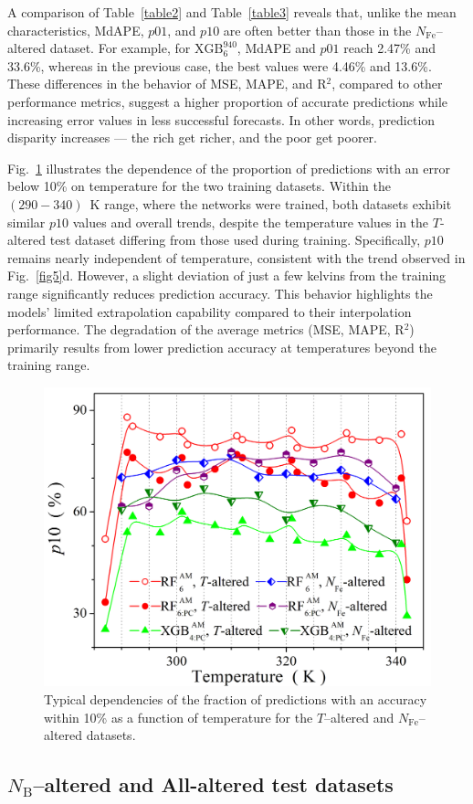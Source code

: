 \documentclass[a4paper,fleqn]{cas-sc}
\begin{document}
A comparison of Table~\ref{table2} and Table~\ref{table3} reveals that, 
unlike the mean characteristics, MdAPE, $p01$, and $p10$ are often better than those in the $N_\mathrm{Fe}$--altered dataset.
For example, for $\mathrm{XGB}^{940}_{6}$, MdAPE and $p01$ reach 2.47\% and 33.6\%, 
whereas in the previous case, the best values were 4.46\% and 13.6\%.
These differences in the behavior of MSE, MAPE, and R$^2$, compared to other performance metrics, 
suggest a higher proportion of accurate predictions while increasing error values in less successful forecasts.
In other words, prediction disparity increases --- 
the rich get richer, and the poor get poorer.

Fig.~\ref{fig10} illustrates the dependence of the proportion of predictions with an error below 10\% on temperature for the two training datasets.
Within the $(290-340)$~K range, where the networks were trained, both datasets exhibit similar $p10$ values and overall trends, 
despite the temperature values in the $T$-altered test dataset differing from those used during training.
Specifically, $p10$ remains nearly independent of temperature, consistent with the trend observed in Fig.~\ref{fig5}d.
However, a slight deviation of just a few kelvins from the training range significantly reduces prediction accuracy.
This behavior highlights the models' limited extrapolation capability compared to their interpolation performance.
The degradation of the average metrics (MSE, MAPE, R$^2$) primarily results from lower prediction accuracy at temperatures beyond the training range.

\begin{figure}
  \centering
     \includegraphics[width=0.5\linewidth]{Fig10.png}
    \caption{Typical dependencies of the fraction of predictions with an accuracy within 10\% 
    as a function of temperature for the $T$--altered and $N_\mathrm{Fe}$--altered datasets.
}\label{fig10}
\end{figure}


\subsection{$N_\mathrm{B}$--altered and All-altered test datasets}
\end{document}
